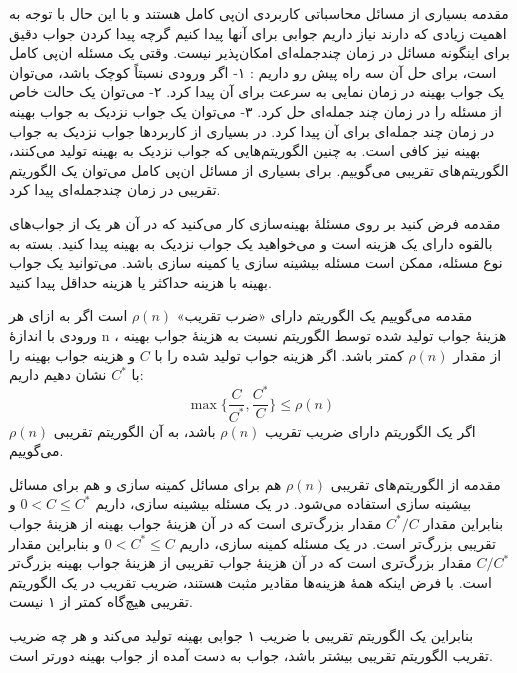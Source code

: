 \begin{itemframe}{مقدمه}
\itm
بسیاری از مسائل محاسباتی کاربردی ان‌پی کامل هستند و با این حال با توجه به اهمیت زیادی که دارند نیاز داریم جوابی برای آنها پیدا کنیم گرچه پیدا کردن جواب دقیق برای اینگونه مسائل در زمان چندجمله‌ای امکان‌پذیر نیست.
\itm
وقتی یک مسئله ان‌پی کامل است، برای حل آن سه راه پیش رو داریم : ۱- اگر ورودی نسبتاً کوچک باشد، می‌توان یک جواب بهینه در زمان نمایی به سرعت برای آن پیدا کرد. ۲- می‌توان یک حالت خاص از مسئله را در زمان چند جمله‌ای حل کرد. ۳- می‌توان یک جواب نزدیک به جواب بهینه در زمان چند جمله‌ای برای آن پیدا کرد.
\itm
در بسیاری از کاربردها جواب نزدیک به جواب بهینه
نیز کافی است. به چنین الگوریتم‌هایی که جواب نزدیک به بهینه تولید می‌کنند، الگوریتم‌های تقریبی
می‌گوییم. برای بسیاری از مسائل ان‌پی کامل می‌توان یک الگوریتم تقریبی در زمان چندجمله‌ای پیدا کرد.
\end{itemframe}


\begin{itemframe}{مقدمه}
\itm
فرض کنید بر روی مسئلهٔ بهینه‌سازی کار می‌کنید که در آن هر یک از جواب‌های بالقوه
دارای یک هزینه است و می‌خواهید یک جواب نزدیک به بهینه پیدا کنید. بسته به نوع مسئله، ممکن است مسئله بیشینه سازی
یا کمینه سازی
باشد. می‌توانید یک جواب بهینه با هزینه حداکثر یا هزینه حداقل پیدا کنید.
\end{itemframe}


\begin{itemframe}{مقدمه}
\itm
می‌گوییم یک الگوریتم دارای «ضرب تقریب»
$\rho(n)$
است اگر به ازای هر ورودی با اندازهٔ n ، هزینهٔ جواب تولید شده توسط الگوریتم نسبت به هزینهٔ جواب بهینه از مقدار
$\rho(n)$
کمتر باشد. اگر هزینه جواب تولید شده را با
$C$
و هزینه جواب بهینه را با
$C^*$
 نشان دهیم داریم:
$$
\max \{ \frac{C}{C^*}, \frac{C^*}{C} \} \leqslant \rho(n)
$$
\itm
اگر یک الگوریتم دارای ضریب تقریب
$\rho(n)$
باشد، به آن الگوریتم تقریبی
$\rho(n)$
می‌گوییم.
\end{itemframe}


\begin{itemframe}{مقدمه}
\itm
از الگوریتم‌های تقریبی
$\rho(n)$
هم برای مسائل کمینه سازی و هم برای مسائل بیشینه سازی استفاده می‌شود.
\itm
در یک مسئله بیشینه سازی، داریم
$0 < C \leqslant C^*$
و بنابراین مقدار
$C^*/C$
مقدار بزرگ‌تری است که در آن هزینهٔ جواب بهینه از هزینهٔ جواب تقریبی بزرگ‌تر است.
\itm
در یک مسئله کمینه سازی، داریم
$0 < C^* \leqslant C$
و بنابراین مقدار
$C/C^*$
مقدار بزرگ‌تری است که در آن هزینهٔ جواب تقریبی از هزینهٔ جواب بهینه بزرگ‌تر است.
\itm
با فرض اینکه همهٔ هزینه‌ها مقادیر مثبت هستند، ضریب تقریب در یک الگوریتم تقریبی هیچ‌گاه کمتر از ۱ نیست.

\itm
بنابراین یک الگوریتم تقریبی با ضریب ۱ جوابی بهینه تولید می‌کند و هر چه ضریب تقریب الگوریتم تقریبی بیشتر باشد، جواب به دست آمده از جواب بهینه دورتر است.
\end{itemframe}


